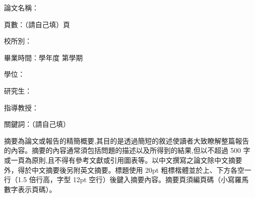 \begin{ZhAbstract}
    \begin{ZhAbstractItems}
        \noindent \text 論文名稱：\cTitle

        \noindent \text 頁數：（請自己填）頁

        \noindent \text 校所別：\univCname \space \deptCname

        \noindent \text 畢業時間：\cAcademicYear 學年度 \space 第\cGraduateSemester 學期

        \noindent \text 學位：\degreeCname

        \noindent \text 研究生：\myCname

        \noindent \text 指導教授：\advisorCname

        \noindent \text 關鍵詞：（請自己填）

    \end{ZhAbstractItems}

    \begin{ZhAbstractDescription}
        摘要為論文或報告的精簡概要,其目的是透過簡短的敘述使讀者大致瞭解整篇報告的內容。摘要的內容通常須包括問題的描述以及所得到的結果,但以不超過 500 字或一頁為原則,且不得有參考文獻或引用圖表等。以中文撰寫之論文除中文摘要外，得於中文摘要後另附英文摘要。標題使用 20pt 粗標楷體並於上、下方各空一行（1.5 倍行高，字型 12pt 空行）後鍵入摘要內容。摘要頁須編頁碼（小寫羅馬數字表示頁碼）。
    \end{ZhAbstractDescription}
    
\end{ZhAbstract}

